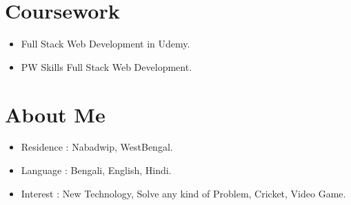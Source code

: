 \documentclass[letterpaper,11pt]{article}
\newcommand{\resumeItem}[1]{
  \item\small{
    {#1 \vspace{-2pt}}
  }
}
\newcommand{\resumeItemListStart}{\begin{itemize}}
\newcommand{\resumeItemListEnd}{\end{itemize}\vspace{-5pt}}
\begin{document}
  \section{Coursework}
    \resumeItemListStart
        \resumeItem {Full Stack Web Development in Udemy.} \\
        \resumeItem {PW Skills Full Stack Web Development.} \\
    \resumeItemListEnd
\sectionsep
 \section{About Me} 
    \resumeItemListStart
        \resumeItem {Residence : Nabadwip, WestBengal.} \\
        \resumeItem {Language : Bengali, English, Hindi.} \\
        \resumeItem {Interest : New Technology, Solve any kind of Problem, Cricket, Video Game.} \\
    \resumeItemListEnd
\sectionsep


%


\end{document}
